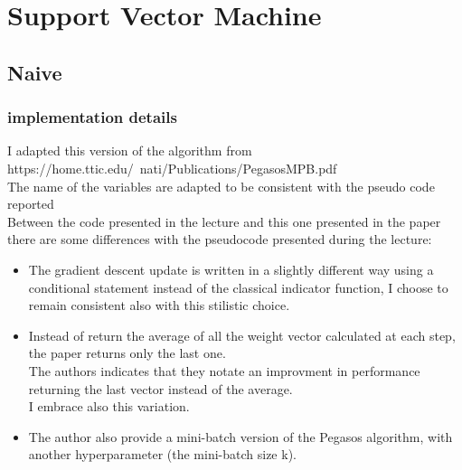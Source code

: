 \newpage
\section{Support Vector Machine}
\subsection{Naive}
\subsubsection{implementation details}
I adapted this version of the algorithm from https://home.ttic.edu/~nati/Publications/PegasosMPB.pdf\\
The name of the variables are adapted to be consistent with the pseudo code reported\\
Between the code presented in the lecture and this one presented in the paper there are some differences with the pseudocode presented during the lecture:\\
\begin{itemize}
    \item The gradient descent update is written in a slightly different way using a conditional statement instead of the classical indicator function, I choose to remain consistent also with this stilistic choice.\\
    \item Instead of return the average of all the weight vector calculated at each step, the paper returns only the last one.\\ 
    The authors indicates that they notate an improvment in performance returning the last vector instead of the average.\\ 
    I embrace also this variation.\\
    \item The author also provide a mini-batch version of the Pegasos algorithm, with another hyperparameter (the mini-batch size k).\\
\end{itemize}

